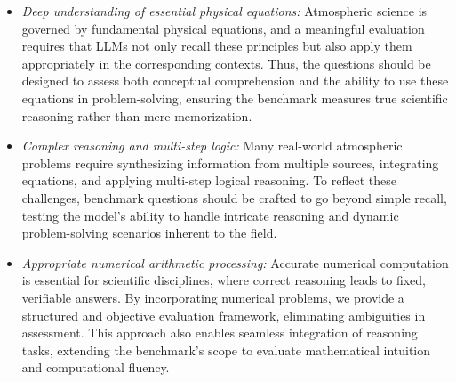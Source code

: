 \begin{itemize}[topsep=5pt, leftmargin=1em]
    \vspace{-0.5em}
    \item \textit{Deep understanding of essential physical equations:} Atmospheric science is governed by fundamental physical equations, and a meaningful evaluation requires that LLMs not only recall these principles but also apply them appropriately in the corresponding contexts. Thus, the questions should be designed to assess both conceptual comprehension and the ability to use these equations in problem-solving, ensuring the benchmark measures true scientific reasoning rather than mere memorization. %

    \vspace{-0.35em}
    \item \textit{Complex reasoning and multi-step logic:} %
    Many real-world atmospheric problems require synthesizing information from multiple sources, integrating equations, and applying multi-step logical reasoning. To reflect these challenges, benchmark questions should be crafted to go beyond simple recall, testing the model’s ability to handle intricate reasoning and dynamic problem-solving scenarios inherent to the field.

    \vspace{-0.35em}
    \item \textit{Appropriate numerical arithmetic processing:} 
    Accurate numerical computation is essential for scientific disciplines, where correct reasoning leads to fixed, verifiable answers. By incorporating numerical problems, we provide a structured and objective evaluation framework, eliminating ambiguities in assessment. This approach also enables seamless integration of reasoning tasks, extending the benchmark’s scope to evaluate mathematical intuition and computational fluency.
    \vspace{-0.5em}
\end{itemize}

